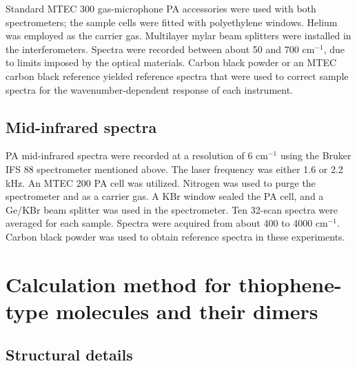 	Standard MTEC 300 gas-microphone PA accessories were used with both spectrometers; the sample cells were fitted with polyethylene windows. Helium was employed as the carrier gas. Multilayer mylar beam splitters were installed in the interferometers. Spectra were recorded between about 50 and 700 cm$^{-1}$, due to limits imposed by the optical materials. Carbon black powder or an MTEC carbon black reference yielded reference spectra that were used to correct sample spectra for the wavenumber-dependent response of each instrument.\\
	
	\subsection{Mid-infrared spectra}
	
	\bigskip
	
	PA mid-infrared spectra were recorded at a resolution of 6 cm$^{-1}$ using the Bruker IFS 88 spectrometer mentioned above. The laser frequency was either 1.6 or 2.2 kHz. An MTEC 200 PA cell was utilized. Nitrogen was used to purge the spectrometer and as a carrier gas. A KBr window sealed the PA cell, and a Ge/KBr beam splitter was used in the spectrometer. Ten 32-scan spectra were averaged for each sample. Spectra were acquired from about 400 to 4000 cm$^{-1}$. Carbon black powder was used to obtain reference spectra in these experiments.
	
	
	\section{Calculation method for thiophene-type molecules and their dimers}
	
	\bigskip
	
	\subsection{Structural details }
	

